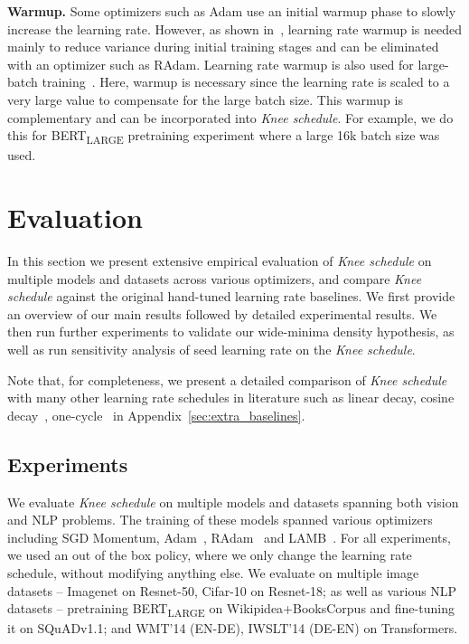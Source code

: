 \documentclass[twoside,11pt]{article}
\newcommand{\lrschedule}{\textit{Knee schedule}}
\begin{document}
\noindent
{\bf Warmup.} Some optimizers such as Adam use an initial warmup phase to slowly increase the learning rate. However, as shown in~\citet{liu2019variance_radam}, learning rate warmup is needed mainly to reduce variance during initial training stages and can be eliminated with an optimizer such as RAdam. Learning rate warmup is also used for large-batch training~\citep{goyal-imagenet-in-an-hour-2017}. Here, warmup is necessary since the learning rate is scaled to a very large value to compensate for the large batch size. This warmup is complementary and can be incorporated into \lrschedule{}. For example, we do this for BERT\textsubscript{LARGE} pretraining experiment where a large 16k batch size was used.
 \vspace{-6pt}
\section{Evaluation}
\label{sec:experiments}

In this section we present extensive empirical evaluation of \lrschedule{} on multiple models and datasets across various optimizers, and compare \lrschedule{} against the original hand-tuned learning rate baselines. We first provide an overview of our main results followed by detailed experimental results. We then run further experiments to validate our wide-minima density hypothesis, as well as run sensitivity analysis of seed learning rate on the \lrschedule{}. 

Note that, for completeness, we present a detailed comparison of \lrschedule{} with many other learning rate schedules in literature such as linear decay, cosine decay~\citep{loshchilov2016sgdr}, one-cycle~\citep{smith2018disciplined_onecycle} in Appendix~\ref{sec:extra_baselines}.

\subsection{Experiments}

We evaluate \lrschedule{} on multiple models and datasets spanning both vision and NLP problems. The training of these models spanned various optimizers including SGD Momentum, Adam~\citep{adam_kingma2014adam}, RAdam~\citep{liu2019variance_radam} and LAMB~\citep{bert76lamb}. For all experiments, we used an out of the box policy, where we only change the learning rate schedule, without modifying anything else. We evaluate on multiple image datasets -- Imagenet on Resnet-50, Cifar-10 on Resnet-18; as well as various NLP datasets -- pretraining BERT\textsubscript{LARGE} on Wikipidea+BooksCorpus and fine-tuning it on SQuADv1.1; and WMT'14 (EN-DE), IWSLT'14 (DE-EN) on Transformers.
\end{document}
